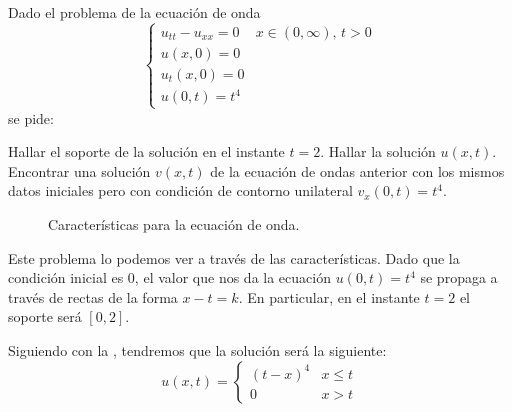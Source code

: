 \begin{problem} Dado el problema de la ecuación de onda
\[
\begin{cases}
	u_{tt} - u_{xx} = 0 & x∈ (0,∞),\, t > 0\\
	u(x,0) = 0 \\
	u_t(x,0) = 0 \\
	u(0,t) = t^4
\end{cases}
\] se pide:

\ppart Hallar el soporte de la solución en el instante $t = 2$.
\ppart Hallar la solución $u(x,t)$.
\ppart Encontrar una solución $v(x,t)$ de la ecuación de ondas anterior con los mismos datos iniciales pero con condición de contorno unilateral $v_x(0,t) = t^4$.

\solution

\spart

\begin{wrapfigure}{R}{0.3\textwidth}
\vspace{-15pt}
\vspace{-15pt}
\caption{Características para la ecuación de onda.}
\label{fig:Ex3Ej2}
\end{wrapfigure}

Este problema lo podemos ver a través de las características. Dado que la condición inicial es $0$, el valor que nos da la ecuación $u(0,t) = t^4$ se propaga a través de rectas de la forma $x - t = k$. En particular, en el instante $t = 2$ el soporte será $[0, 2]$.

\spart

Siguiendo con la , tendremos que la solución será la siguiente: \[ u(x,t) = \begin{cases}
(t - x)^4 & x ≤ t \\
0 & x > t
\end{cases}\]

\end{problem}
